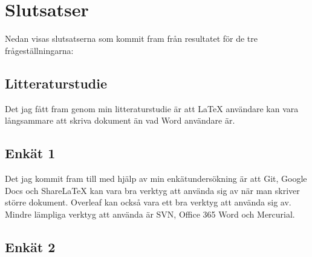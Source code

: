 
\section{Slutsatser}
\label{sec:conclusions-tuhkala}
Nedan visas slutsatserna som kommit fram från resultatet för de tre frågeställningarna:

\subsection{Litteraturstudie}
Det jag fått fram genom min litteraturstudie är att LaTeX användare kan vara långsammare att skriva dokument än vad Word användare är. 

\subsection{Enkät 1}
Det jag kommit fram till med hjälp av min enkätundersökning är att Git, Google Docs och ShareLaTeX kan vara bra verktyg att använda sig av när man skriver större dokument. Overleaf kan också vara ett bra verktyg att använda sig av. Mindre lämpliga verktyg att använda är SVN, Office 365 Word och Mercurial.

\subsection{Enkät 2}


